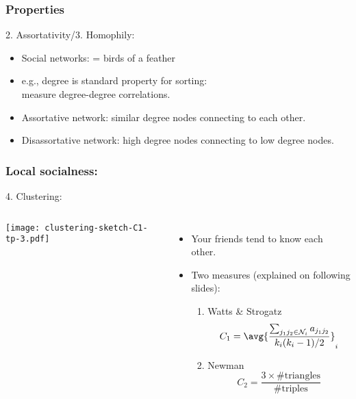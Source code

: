 \begin{frame}
  \frametitle{Properties}

  \begin{block}{2. Assortativity/3. Homophily:}
    \begin{itemize}
    \item<1-> Social networks:  = birds of a feather
    \item<2-> e.g., degree is standard property for sorting:\\
      measure degree-degree correlations.
    \item<3->
      \alert{Assortative} network:\cite{newman2002a} 
      similar degree nodes connecting to each other.\\
    \item<4->
      \alert{Disassortative} network: high degree nodes connecting to low degree nodes.\\
    \end{itemize}
  \end{block}

\end{frame}

\begin{frame}
  \frametitle{Local socialness:}

  \begin{block}{4. Clustering:}
    \begin{columns}
      \texttt{[image: clustering-sketch-C1-tp-3.pdf]}
      \begin{itemize}
      \item<2-> Your friends tend to know each other.
      \item<3-> Two measures (explained on following slides):
        \begin{enumerate}
        \item<3-> Watts \& Strogatz\cite{watts1998a}
          $$ 
          C_1 
          = 
          \avg{
            \frac{\sum_{j_1 j_2 \in {\cal N}_i} a_{j_1 j_2}}
            {k_i(k_i-1)/2}}_{i}
          $$  
        \item<3-> Newman\cite{newman2003a}
          $$ 
          C_2 
          = 
          \frac{3 \times \textrm{\#triangles}}
          {\textrm{\#triples} }
          $$ 
        \end{enumerate}
      \end{itemize}
    \end{columns}  
  \end{block}

\end{frame}


